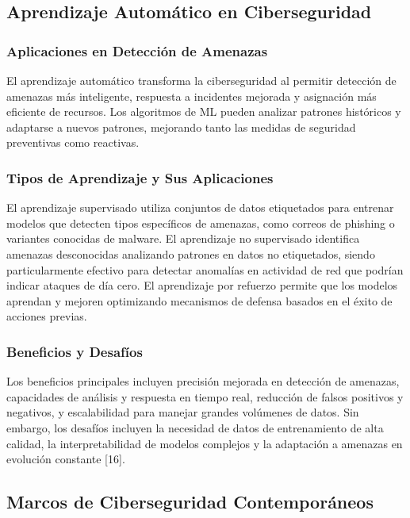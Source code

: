 \subsection{Aprendizaje Automático en Ciberseguridad}

\subsubsection{Aplicaciones en Detección de Amenazas}

El aprendizaje automático transforma la ciberseguridad al permitir detección de amenazas más inteligente, respuesta a incidentes mejorada y asignación más eficiente de recursos. Los algoritmos de ML pueden analizar patrones históricos y adaptarse a nuevos patrones, mejorando tanto las medidas de seguridad preventivas como reactivas.

\subsubsection{Tipos de Aprendizaje y Sus Aplicaciones}

El aprendizaje supervisado utiliza conjuntos de datos etiquetados para entrenar modelos que detecten tipos específicos de amenazas, como correos de phishing o variantes conocidas de malware. El aprendizaje no supervisado identifica amenazas desconocidas analizando patrones en datos no etiquetados, siendo particularmente efectivo para detectar anomalías en actividad de red que podrían indicar ataques de día cero. El aprendizaje por refuerzo permite que los modelos aprendan y mejoren optimizando mecanismos de defensa basados en el éxito de acciones previas.

\subsubsection{Beneficios y Desafíos}

Los beneficios principales incluyen precisión mejorada en detección de amenazas, capacidades de análisis y respuesta en tiempo real, reducción de falsos positivos y negativos, y escalabilidad para manejar grandes volúmenes de datos. Sin embargo, los desafíos incluyen la necesidad de datos de entrenamiento de alta calidad, la interpretabilidad de modelos complejos y la adaptación a amenazas en evolución constante [16].

\subsection{Marcos de Ciberseguridad Contemporáneos}


